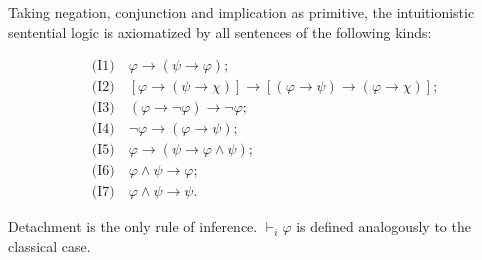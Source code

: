 Taking negation, conjunction and implication as primitive, the intuitionistic sentential logic is axiomatized by all sentences of the following kinds:

\begin{align}
&\text{(I1)}\quad \varphi \rightarrow (\psi \rightarrow \varphi);\\
&\text{(I2)}\quad [\varphi \rightarrow (\psi \rightarrow \chi)] \rightarrow [(\varphi \rightarrow \psi) \rightarrow (\varphi \rightarrow \chi)];\\
&\text{(I3)}\quad (\varphi \rightarrow \neg \varphi) \rightarrow \neg \varphi;\\
&\text{(I4)}\quad \neg \varphi \rightarrow (\varphi \rightarrow \psi);\\
&\text{(I5)}\quad \varphi \rightarrow (\psi \rightarrow \varphi \wedge \psi);\\
&\text{(I6)}\quad \varphi \wedge \psi \rightarrow \varphi;\\
&\text{(I7)}\quad \varphi \wedge \psi \rightarrow \psi.
\end{align}

Detachment is the only rule of inference. $\vdash_i \varphi$ is defined analogously to the classical case.
